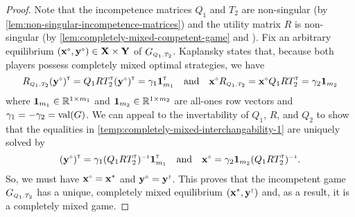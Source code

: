 \begin{proof}
        Note that the incompetence matrices $Q_1$ and $T_2$ are non-singular (by \autoref{lem:non-singular-incompetence-matrices}) and the utility matrix $R$ is non-singular (by \autoref{lem:completely-mixed-competent-game} and \parencite{Kaplansky1945}).
        Fix an arbitrary equilibrium $(\vec{x}^\sdiamond, \vec{y}^\sdiamond) \in \vec{X} \times \vec{Y}$ of $G_\ms{Q_1, T_2}$.
        Kaplansky \parencite[Theorem 1]{Kaplansky1945} states that, because both players possess completely mixed optimal strategies, we have
        \begin{equation} \label{temp:completely-mixed-interchangability-1}
            R_\ms{Q_1, T_2} (\vec{y}^\sdiamond)^\transp
                = Q_1 R T_2^\transp (\vec{y}^\sdiamond)^\transp
                = \gamma_1 \vec{1}_{m_1}^\transp
            \quad\text{and}\quad
            \vec{x}^\sdiamond R_\ms{Q_1, T_2}
                = \vec{x}^\sdiamond Q_1 R T_2^\transp
                = \gamma_2 \vec{1}_{m_2}
        \end{equation}
        where $\mathbf{1}_{m_1} \in \mathbb{R}^{1 \times m_1}$ and $\mathbf{1}_{m_2} \in \mathbb{R}^{1 \times m_2}$ are all-ones row vectors and $\gamma_1 = -\gamma_2 = \operatorname{val}(G)$.
        We can appeal to the invertability of $Q_1$, $R$, and $Q_2$ to show that the equalities in \eqref{temp:completely-mixed-interchangability-1} are uniquely solved by
        \begin{equation}
            (\vec{y}^\sdiamond)^\transp
                = \gamma_1 (Q_1 R T_2^\transp)^\inv \vec{1}_{m_1}^\transp 
            \quad\text{and}\quad
            \vec{x}^\sdiamond
                = \gamma_2 \vec{1}_{m_2} (Q_1 R T_2^\transp)^\inv.
        \end{equation}
        So, we must have $\vec{x}^\sdiamond = \vec{x}^*$ and $\vec{y}^\sdiamond = \vec{y}^\sdagger$.
        This proves that the incompetent game $G_\ms{Q_1, T_2}$ has a unique, completely mixed equilibrium $(\vec{x}^*, \vec{y}^\sdagger)$ and, as a result, it is a completely mixed game.
    \end{proof}

